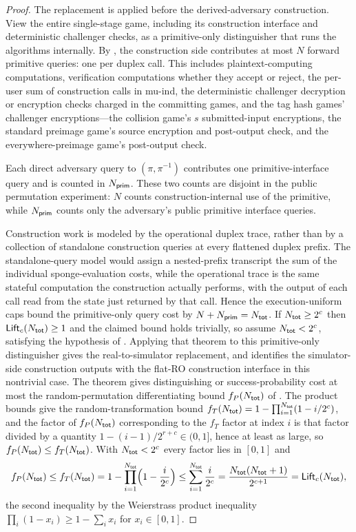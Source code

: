 \begin{proof}
The \cite{BDPV08} replacement is applied before the derived-adversary
construction. View the entire single-stage game, including its
construction interface and deterministic challenger checks, as a
primitive-only distinguisher that runs the \TW{} algorithms internally.
By , the construction side contributes
at most $N$ forward primitive queries: one per duplex call. This includes
plaintext-computing computations, verification computations whether they
accept or reject, the per-user sum of construction calls in mu-ind, the
deterministic challenger decryption or encryption checks charged in the
committing games, and the tag hash games' challenger encryptions---the
collision game's $s$ submitted-input encryptions, the standard preimage
game's source encryption and post-output check, and the
everywhere-preimage game's post-output check.

Each direct adversary query to $(\pi,\pi^{-1})$ contributes one
primitive-interface query and is counted in $N_{\mathsf{prim}}$. These two counts
are disjoint in the public permutation experiment: $N$ counts
construction-internal use of the primitive, while $N_{\mathsf{prim}}$ counts only
the adversary's public primitive interface queries.

Construction work is modeled by the operational duplex trace, rather
than by a collection of standalone \cite{BDPV08} construction queries at
every flattened duplex prefix. The standalone-query model would assign a
nested-prefix transcript the sum of the individual sponge-evaluation
costs, while the operational trace is the same stateful computation the
construction actually performs, with the output of each call read from
the state just returned by that call. Hence the execution-uniform caps
bound the primitive-only query cost by $N+N_{\mathsf{prim}}=N_{\mathsf{tot}}$. If
$N_{\mathsf{tot}} \geq 2^c$ then $\mathsf{Lift}_c(N_{\mathsf{tot}}) \geq 1$ and the claimed bound holds
trivially, so assume $N_{\mathsf{tot}} < 2^c$, satisfying the hypothesis of
\cite[Theorem~2]{BDPV08}. Applying that theorem to this primitive-only
distinguisher gives the real-to-simulator replacement, and
 identifies the simulator-side
construction outputs with the flat-RO construction interface in this
nontrivial case. The theorem gives distinguishing or
success-probability cost at most the random-permutation
differentiating bound $f_P(N_{\mathsf{tot}})$ of \cite[Lemma~5]{BDPV08}. The
\cite[Lemmas~4 and~5]{BDPV08} product bounds give the
random-transformation bound $f_T(N_{\mathsf{tot}}) = 1 - \prod_{i=1}^{N_{\mathsf{tot}}}(1 -
i/2^c)$, and the factor of $f_P(N_{\mathsf{tot}})$ corresponding to the $f_T$ factor
at index $i$ is that factor divided by a quantity
$1 - (i-1)/2^{r+c} \in (0, 1]$, hence at least as large, so
$f_P(N_{\mathsf{tot}}) \leq f_T(N_{\mathsf{tot}})$. With $N_{\mathsf{tot}} < 2^c$ every factor lies in
$[0, 1]$ and
\[
  f_P(N_{\mathsf{tot}}) \leq f_T(N_{\mathsf{tot}})
  = 1 - \prod_{i=1}^{N_{\mathsf{tot}}}\Bigl(1 - \frac{i}{2^c}\Bigr)
  \leq \sum_{i=1}^{N_{\mathsf{tot}}} \frac{i}{2^c}
  = \frac{N_{\mathsf{tot}}(N_{\mathsf{tot}} + 1)}{2^{c+1}}
  = \mathsf{Lift}_c(N_{\mathsf{tot}}),
\]
the second inequality by the Weierstrass product inequality
$\prod_i (1 - x_i) \geq 1 - \sum_i x_i$ for $x_i \in [0, 1]$.
\end{proof}

